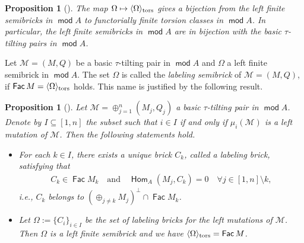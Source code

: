 \documentclass[10pt]{amsart}
\newtheorem{proposition}[theorem]{Proposition}
\theoremstyle{definition}
\theoremstyle{remark}
\numberwithin{equation}{section}
\def\mod{\opname{mod}\nolimits}
\newcommand{\opname}[1]{\operatorname{\mathsf{#1}}}
\newcommand{\Fac}{\opname{Fac}}
\newcommand{\Hom}{\opname{Hom}}
\begin{document}
\begin{proposition}[{\cite[Proposition 2.9]{Asai-semibrick}}] \label{pro:asai-bijection}
The map $\Omega\mapsto \langle \Omega\rangle_{\rm tors}$ gives a bijection from the left finite semibricks in $\mod A$ to functorially finite torsion classes in $\mod A$. In particular, the left finite semibricks in $\mod A$ are in bijection with the basic $\tau$-tilting pairs in $\mod A$.
\end{proposition}

Let $\mathcal M=(M,Q)$ be a basic $\tau$-tilting pair in $\mod A$ and $\Omega$ a left finite semibrick in $\mod A$. The set $\Omega$ is called the {\em labeling semibrick} of $\mathcal M=(M,Q)$, if $\Fac M=\langle\Omega\rangle_{\rm tors}$ holds. This name is justified by the following result.



\begin{proposition}[{\cite[Lemma 2.5, Proposition 2.13]{Asai-semibrick}}] \label{pro:asai-brick}
    Let $\mathcal M=\oplus_{j=1}^n(M_j, Q_j)$ a basic $\tau$-tilting pair in $\mod A$. Denote by $I\subseteq [1,n]$ the subset such that $i\in I$ if and only if $\mu_i(\mathcal M)$ is a left mutation of $\mathcal M$.
    Then the following statements hold.
    \begin{itemize}
        \item [(i)] For each $k\in I$, there exists a unique brick $C_k$, called a labeling brick, satisfying that 
\begin{eqnarray*}
            C_k\in\Fac M_k\quad\text{and}\quad \Hom_A(M_j,C_k)=0\quad \forall j\in[1,n]\setminus k,
        \end{eqnarray*}
        i.e., $C_k$ belongs to $(\oplus_{j\neq k}M_j)^\bot\cap \Fac M_k$.
        \item [(ii)] Let $\Omega:=\{C_i\}_{i\in I}$ be the set of labeling bricks for the left mutations of $\mathcal M$. Then $\Omega$ is a left finite semibrick and we have $\langle \Omega\rangle_{\rm tors}=\Fac M$.
    \end{itemize}
\end{proposition}
\end{document}
